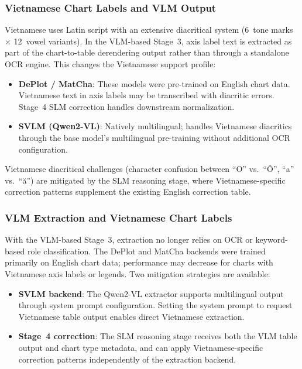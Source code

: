 \subsubsection{Vietnamese Chart Labels and VLM Output}

Vietnamese uses Latin script with an extensive diacritical system (6~tone marks $\times$
12~vowel variants). In the VLM-based Stage~3, axis label text is extracted as part of
the chart-to-table derendering output rather than through a standalone OCR engine.
This changes the Vietnamese support profile:

\begin{itemize}
    \item \textbf{DePlot / MatCha}: These models were pre-trained on English chart data.
          Vietnamese text in axis labels may be transcribed with diacritic errors.
          Stage~4 SLM correction handles downstream normalization.
    \item \textbf{SVLM (Qwen2-VL)}: Natively multilingual; handles Vietnamese
          diacritics through the base model's multilingual pre-training without
          additional OCR configuration.
\end{itemize}

Vietnamese diacritical challenges (character confusion between ``O'' vs.\ ``\^{O}'',
``a'' vs.\ ``\u{a}'') are mitigated by the SLM reasoning stage, where
Vietnamese-specific correction patterns supplement the existing English correction table.

\subsubsection{VLM Extraction and Vietnamese Chart Labels}

With the VLM-based Stage~3, extraction no longer relies on OCR or keyword-based role
classification. The DePlot and MatCha backends were trained primarily on English chart
data; performance may decrease for charts with Vietnamese axis labels or legends. Two
mitigation strategies are available:

\begin{itemize}
    \item \textbf{SVLM backend}: The Qwen2-VL extractor supports multilingual output
          through system prompt configuration. Setting the system prompt to request
          Vietnamese table output enables direct Vietnamese extraction.
    \item \textbf{Stage~4 correction}: The SLM reasoning stage receives both the VLM
          table output and chart type metadata, and can apply Vietnamese-specific
          correction patterns independently of the extraction backend.
\end{itemize}

